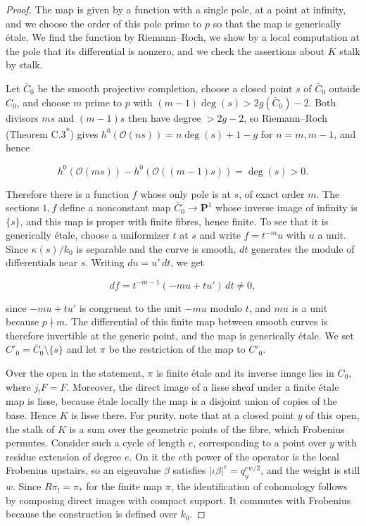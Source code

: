 \documentclass[11pt]{article}
\newcommand{\bpout}[1]{#1\textsuperscript{\hyperlink{bp-outside}{\ensuremath{\ast}}}}
\begin{document}
\begin{proof}[{Proof}]\label{bp264}%
The map is given by a function with a single pole, at a point at infinity, and we choose the order of this pole prime to \(p\) so that the map is generically étale. We find the function by Riemann–Roch, we show by a local computation at the pole that its differential is nonzero, and we check the assertions about \(K\) stalk by stalk.

Let \(\overline C_0\) be the smooth projective completion, choose a closed point \(s\) of \(\overline C_0\) outside \(C_0\), and choose \(m\) prime to \(p\) with \((m-1)\deg(s)>2g(\overline C_0)-2\). Both divisors \(ms\) and \((m-1)s\) then have degree \(>2g-2\), so Riemann–Roch (Theorem \bpout{C.3}) gives \(h^0(\mathcal O(ns))=n\deg(s)+1-g\) for \(n=m,m-1\), and hence

\[
h^0(\mathcal O(ms))-h^0(\mathcal O((m-1)s))=\deg(s)>0.
\]

Therefore there is a function \(f\) whose only pole is at \(s\), of exact order \(m\). The sections \(1,f\) define a nonconstant map \(\overline C_0\to\mathbf P^1\) whose inverse image of infinity is \(\{s\}\), and this map is proper with finite fibres, hence finite. To see that it is generically étale, choose a uniformizer \(t\) at \(s\) and write \(f=t^{-m}u\) with \(u\) a unit. Since \(\kappa(s)/k_0\) is separable and the curve is smooth, \(dt\) generates the module of differentials near \(s\). Writing \(du=u'\,dt\), we get

\[
df=t^{-m-1}(-mu+tu')\,dt\ne0,
\]

since \(-mu+tu'\) is congruent to the unit \(-mu\) modulo \(t\), and \(mu\) is a unit because \(p\nmid m\). The differential of this finite map between smooth curves is therefore invertible at the generic point, and the map is generically étale. We set \(C'_0=\overline C_0\setminus\{s\}\) and let \(\pi\) be the restriction of the map to \(C'_0\).

Over the open in the statement, \(\pi\) is finite étale and its inverse image lies in \(C_0\), where \(j_!F=F\). Moreover, the direct image of a lisse sheaf under a finite étale map is lisse, because étale locally the map is a disjoint union of copies of the base. Hence \(K\) is lisse there. For purity, note that at a closed point \(y\) of this open, the stalk of \(K\) is a sum over the geometric points of the fibre, which Frobenius permutes. Consider such a cycle of length \(e\), corresponding to a point over \(y\) with residue extension of degree \(e\). On it the \(e\)th power of the operator is the local Frobenius upstairs, so an eigenvalue \(\beta\) satisfies \(|\iota\beta|^e=q_y^{ew/2}\), and the weight is still \(w\). Since \(R\pi_!=\pi_*\) for the finite map \(\pi\), the identification of cohomology follows by composing direct images with compact support. It commutes with Frobenius because the construction is defined over \(k_0\).
\end{proof}
\end{document}

